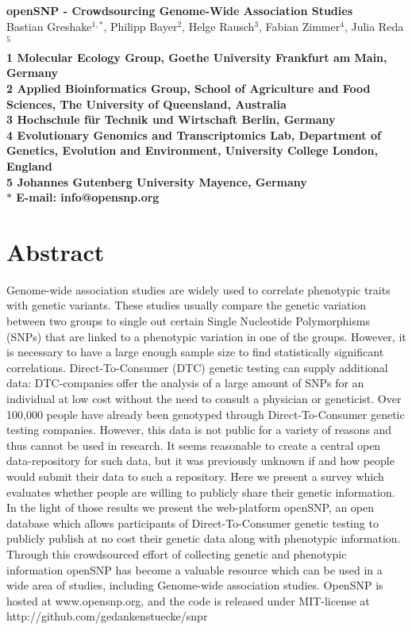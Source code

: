 \documentclass[10pt]{article}
\date{}
\begin{document}
\begin{flushleft}
{\Large
\textbf{openSNP - Crowdsourcing Genome-Wide Association Studies}
}
% 
\\
Bastian Greshake$^{1,\ast}$, 
Philipp Bayer$^{2}$, 
Helge Rausch$^{3}$,
Fabian Zimmer$^{4}$,
Julia Reda$^{5}$
\\
\bf{1} Molecular Ecology Group, Goethe University Frankfurt am Main, Germany
\\
\bf{2} Applied Bioinformatics Group, School of Agriculture and Food Sciences, The University of Queensland, Australia
\\
\bf{3} Hochschule f\"ur Technik und Wirtschaft Berlin, Germany 
\\
\bf{4} Evolutionary Genomics and Transcriptomics Lab, Department of Genetics, Evolution and Environment, University College London, England
\\
\bf{5} Johannes Gutenberg University Mayence, Germany
\\
$\ast$ E-mail: info@opensnp.org
\end{flushleft}

\section*{Abstract}
Genome-wide association studies are widely used to correlate phenotypic traits with genetic variants. These studies usually compare the genetic variation between two groups to single out certain Single Nucleotide Polymorphisms (SNPs) that are linked to a phenotypic variation in one of the groups. However, it is necessary to have a large enough sample size to find statistically significant correlations. Direct-To-Consumer (DTC) genetic testing can supply additional data: DTC-companies offer the analysis of a large amount of SNPs for an individual at low cost without the need to consult a physician or geneticist. Over 100,000 people have already been genotyped through Direct-To-Consumer genetic testing companies. However, this data is not public for a variety of reasons and thus cannot be used in research. It seems reasonable to create a central open data-repository for such data, but it was previously unknown if and how people would submit their data to such a repository. Here we present a survey which evaluates whether people are willing to publicly share their genetic information. In the light of those results we present the web-platform openSNP, an open database which allows participants of Direct-To-Consumer genetic testing to publicly publish at no cost their genetic data along with phenotypic information. Through this crowdsourced effort of collecting genetic and phenotypic information openSNP has become a valuable resource which can be used in a wide area of studies, including Genome-wide association studies. OpenSNP is hosted at www.opensnp.org, and the code is released under MIT-license at http://github.com/gedankenstuecke/snpr
\end{document}
